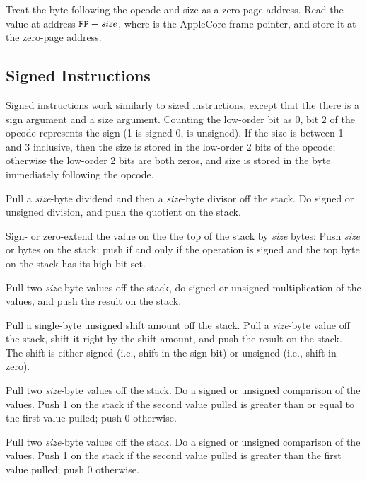 \documentclass[10pt]{article}
\begin{document}
Treat the byte following the opcode and size as a zero-page
address.  Read the value at address $\texttt{FP}+\mbox{\textit{size}}$, 
where  is the AppleCore frame pointer, and store
it at the zero-page address.

\subsection{Signed Instructions}

Signed instructions work similarly to sized instructions, except that
the there is a sign argument and a size argument.  Counting the
low-order bit as 0, bit 2 of the opcode represents the sign (1 is
signed 0, is unsigned).  If the size is between 1 and 3 inclusive,
then the size is stored in the low-order 2 bits of the opcode;
otherwise the low-order 2 bits are both zeros, and size is stored in
the byte immediately following the opcode.

 Pull a \emph{size}-byte
dividend and then a \emph{size}-byte divisor off the stack.  Do signed
or unsigned division, and push the quotient on the stack.

 Sign- or zero-extend the
value on the the top of the stack by \emph{size} bytes: Push
\emph{size}  or  bytes on the stack; push
 if and only if the operation is signed and the top byte on
the stack has its high bit set.

 Pull two \emph{size}-byte
values off the stack, do signed or unsigned multiplication of the
values, and push the result on the stack.

 Pull a single-byte
unsigned shift amount off the stack.  Pull a \emph{size}-byte value
off the stack, shift it right by the shift amount, and push the result
on the stack.  The shift is either signed (i.e., shift in the sign
bit) or unsigned (i.e., shift in zero).

 Pull two
\emph{size}-byte values off the stack. Do a signed or unsigned
comparison of the values.  Push 1 on the stack if the second value
pulled is greater than or equal to the first value pulled; push 0
otherwise.

 Pull two
\emph{size}-byte values off the stack. Do a signed or unsigned
comparison of the values.  Push 1 on the stack if the second value
pulled is greater than the first value pulled; push 0 otherwise.
\end{document}
